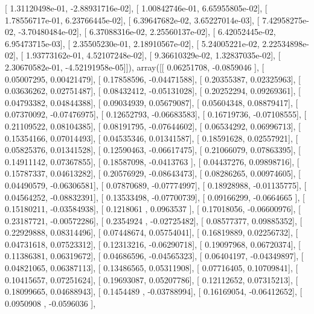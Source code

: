 \documentclass{article}
\begin{document}
       [  1.31120498e-01,  -2.88931716e-02],
       [  1.00842746e-01,   6.65955805e-02],
       [  1.78556717e-01,   6.23766445e-02],
       [  6.39647682e-02,   3.65227014e-03],
       [  7.42958275e-02,  -3.70480484e-02],
       [  6.37088316e-02,   2.25560137e-02],
       [  6.42052445e-02,   6.95473715e-03],
       [  2.35505230e-01,   2.18910567e-02],
       [  5.24005221e-02,   2.22534898e-02],
       [  1.93773162e-01,   4.52107248e-02],
       [  9.36610329e-02,   1.32837035e-02],
       [  2.30670582e-01,  -4.52191958e-05]]), array([[ 0.06251708, -0.0859046 ],
       [ 0.05007295,  0.00421479],
       [ 0.17858596, -0.04471588],
       [ 0.20355387,  0.02325963],
       [ 0.03636262,  0.02751487],
       [ 0.08432412, -0.05131028],
       [ 0.20252294,  0.09269361],
       [ 0.04793382,  0.04844388],
       [ 0.09034939,  0.05679087],
       [ 0.05604348,  0.08879417],
       [ 0.07370092, -0.07476975],
       [ 0.12652793, -0.06683583],
       [ 0.16719736, -0.07108555],
       [ 0.21109522,  0.08104385],
       [ 0.08191795, -0.07644602],
       [ 0.06534292,  0.06996713],
       [ 0.15354166,  0.07014493],
       [ 0.04535346,  0.01341587],
       [ 0.18591628,  0.02557921],
       [ 0.05825376,  0.01341528],
       [ 0.12590463, -0.06617475],
       [ 0.21066079,  0.07863395],
       [ 0.14911142,  0.07367855],
       [ 0.18587098, -0.0413763 ],
       [ 0.04437276,  0.09898716],
       [ 0.15787337,  0.04613282],
       [ 0.20576929, -0.08643473],
       [ 0.08286265,  0.00974605],
       [ 0.04490579, -0.06306581],
       [ 0.07870689, -0.07774997],
       [ 0.18928988, -0.01135775],
       [ 0.04564252, -0.08832391],
       [ 0.13533498, -0.07700739],
       [ 0.09166299, -0.0664665 ],
       [ 0.15180211, -0.03584938],
       [ 0.1218061 ,  0.0963537 ],
       [ 0.17018056, -0.06600976],
       [ 0.23187721, -0.00572286],
       [ 0.2354924 , -0.02725482],
       [ 0.08577377,  0.09885352],
       [ 0.22929888,  0.08314496],
       [ 0.07448674,  0.05754041],
       [ 0.16819889,  0.02256732],
       [ 0.04731618,  0.07523312],
       [ 0.12313216, -0.06290718],
       [ 0.19097968,  0.06720374],
       [ 0.11386381,  0.06319672],
       [ 0.04686596, -0.04565323],
       [ 0.06404197, -0.04349897],
       [ 0.04821065,  0.06387113],
       [ 0.13486565,  0.05311908],
       [ 0.07716405,  0.10709841],
       [ 0.10415657,  0.07251624],
       [ 0.19693087,  0.05207786],
       [ 0.12112652,  0.07315213],
       [ 0.18099665,  0.04688943],
       [ 0.1454489 , -0.03788994],
       [ 0.16169054, -0.06412652],
       [ 0.0950908 , -0.0596036 ],
\end{document}
